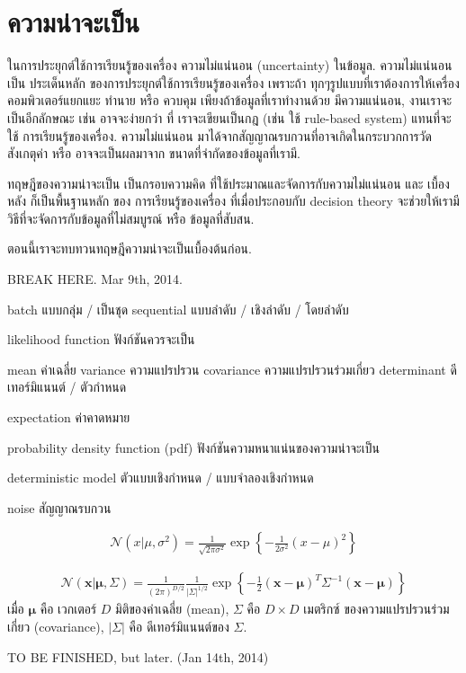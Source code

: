 
\section{ความน่าจะเป็น}
\label{section: Probability}

ในการประยุกต์ใช้การเรียนรู้ของเครื่อง ความไม่แน่นอน (uncertainty) ในข้อมูล. 
ความไม่แน่นอน เป็น ประเด็นหลัก ของการประยุกต์ใช้การเรียนรู้ของเครื่อง เพราะถ้า ทุกๆรูปแบบที่เราต้องการให้เครื่องคอมพิวเตอร์แยกแยะ ทำนาย หรือ ควบคุม เพียงถ้าข้อมูลที่เราทำงานด้วย มีความแน่นอน, งานเราจะเป็นอีกลักษณะ เช่น อาจจะง่ายกว่า ที่ เราจะเขียนเป็นกฎ (เช่น ใช้ rule-based system) แทนที่จะใช้ การเรียนรู้ของเครื่อง.
ความไม่แน่นอน มาได้จากสัญญาณรบกวนที่อาจเกิดในกระบวกการวัดสังเกตุค่า หรือ อาจจะเป็นผลมาจาก ขนาดที่จำกัดของข้อมูลที่เรามี.

ทฤษฎีของความน่าจะเป็น เป็นกรอบความคิด ที่ใช้ประมาณและจัดการกับความไม่แน่นอน และ เบื้องหลัง ก็เป็นพื้นฐานหลัก ของ การเรียนรู้ของเครื่อง ที่เมื่อประกอบกับ decision theory จะช่วยให้เรามีวิธีที่จะจัดการกับข้อมูลที่ไม่สมบูรณ์ หรือ ข้อมูลที่สับสน.

ตอนนี้เราจะทบทวนทฤษฎีความน่าจะเป็นเบื้องต้นก่อน.

BREAK HERE. Mar 9th, 2014.

batch แบบกลุ่ม / เป็นชุด
sequential แบบลำดับ / เชิงลำดับ / โดยลำดับ

likelihood function ฟังก์ชันควรจะเป็น

mean ค่าเฉลี่ย
variance ความแปรปรวน
covariance ความแปรปรวนร่วมเกี่ยว
determinant ดีเทอร์มิแนนต์ / ตัวกำหนด

expectation ค่าคาดหมาย

probability density function (pdf) ฟังก์ชันความหนาแน่นของความน่าจะเป็น

deterministic model ตัวแบบเชิงกำหนด / แบบจำลองเชิงกำหนด 

noise สัญญาณรบกวน

\begin{eqnarray}
   \mathcal{N}(x | \mu, \sigma^2)
   = \frac{1}{\sqrt{2 \pi \sigma^2}} \exp \left\{ -\frac{1}{2 \sigma^2} (x - \mu)^2 \right\}
\label{eq: one-D gaussian distribution}
\end{eqnarray}


\begin{eqnarray}
   \mathcal{N}(\mathbf{x} | \mathbf{\mu}, \Sigma)
   = \frac{1}{(2 \pi)^{D/2}} \frac{1}{|\Sigma|^{1/2}} \exp \left\{ -\frac{1}{2} (\mathbf{x} - \mathbf{\mu})^T \Sigma^{-1} (\mathbf{x} - \mathbf{\mu}) \right\}
\label{eq: gaussian distribution}
\end{eqnarray}
เมื่อ $\mathbf{\mu}$ คือ เวกเตอร์ $D$ มิติของค่าเฉลี่ย (mean),
$\Sigma$ คือ $D \times D$ เมตริกซ์ ของความแปรปรวนร่วมเกี่ยว (covariance),
$|\Sigma|$ คือ ดีเทอร์มิแนนต์ของ $\Sigma$.

TO BE FINISHED, but later. (Jan 14th, 2014)
